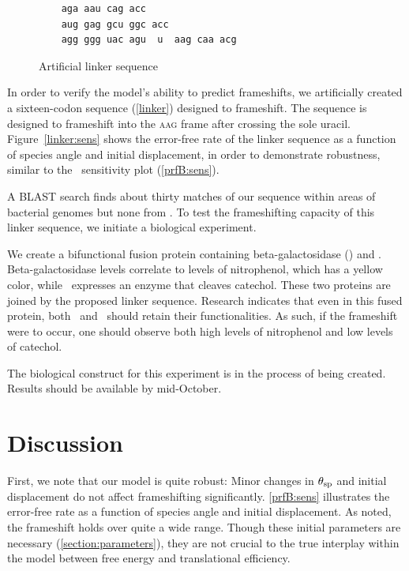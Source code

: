 \documentclass[12pt, draft]{article}
\numberwithin{equation}{section}
\begin{document}
\begin{figure}
  \caption{Artificial linker sequence}
  \label{linker}
  \begin{verbatim}
    aga aau cag acc
    aug gag gcu ggc acc
    agg ggg uac agu  u  aag caa acg
  \end{verbatim}
\end{figure}

In order to verify the model's ability to predict frameshifts, we
artificially created a sixteen-codon sequence (\autoref{linker})
designed to frameshift.  The sequence is designed to frameshift into
the \textsc{aag} frame after crossing the sole uracil.  Figure~\ref{linker:sens}
shows the error-free rate of the linker sequence as a function of species
angle and initial displacement, in order to demonstrate robustness,
similar to the \prfB\ sensitivity plot (\autoref{prfB:sens}).

A BLAST search finds about thirty matches of our sequence within areas of
bacterial genomes but none from \ecoli. To test the frameshifting capacity of
this linker sequence, we initiate a biological experiment.

We create a bifunctional fusion protein containing beta-galactosidase (\bgals) 
and \xylE.  Beta-galactosidase levels correlate to
levels of nitrophenol, which has a yellow color, while \xylE\ expresses
an enzyme that cleaves catechol.  These two proteins are joined by
the proposed linker sequence.  Research indicates that even in this
fused protein, both \bgals\ and \xylE\ should retain their functionalities.
As such, if the frameshift were to occur, one should observe both 
high levels of nitrophenol and low levels of catechol.

The biological construct for this experiment is in the process of being created.
Results should be available by mid-October.

\section{Discussion}
First, we note that our model is quite robust: Minor changes
in $\theta_{\rm{sp}}$ and initial displacement do not affect
frameshifting significantly.
\autoref{prfB:sens} illustrates the error-free rate as
a function of species angle and initial displacement. As noted,
the frameshift holds over quite a wide range. Though these initial
parameters are necessary (\autoref{section:parameters}), they are not
crucial to the true interplay within the model between free energy and
translational efficiency.
\end{document}
